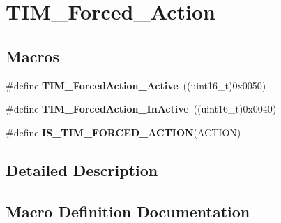 \hypertarget{group___t_i_m___forced___action}{}\section{T\+I\+M\+\_\+\+Forced\+\_\+\+Action}
\label{group___t_i_m___forced___action}
\subsection*{Macros}
\begin{DoxyCompactItemize}
\item 
\hypertarget{group___t_i_m___forced___action_ga19d3769825f1dfdbdbde3edb60310b99}{}\#define {\bfseries T\+I\+M\+\_\+\+Forced\+Action\+\_\+\+Active}~((uint16\+\_\+t)0x0050)\label{group___t_i_m___forced___action_ga19d3769825f1dfdbdbde3edb60310b99}

\item 
\hypertarget{group___t_i_m___forced___action_ga79656f2193ec5e12a15d0ae5b025d273}{}\#define {\bfseries T\+I\+M\+\_\+\+Forced\+Action\+\_\+\+In\+Active}~((uint16\+\_\+t)0x0040)\label{group___t_i_m___forced___action_ga79656f2193ec5e12a15d0ae5b025d273}

\item 
\#define {\bfseries I\+S\+\_\+\+T\+I\+M\+\_\+\+F\+O\+R\+C\+E\+D\+\_\+\+A\+C\+T\+I\+O\+N}(A\+C\+T\+I\+O\+N)
\end{DoxyCompactItemize}


\subsection{Detailed Description}


\subsection{Macro Definition Documentation}
\hypertarget{group___t_i_m___forced___action_gaa2cb16f281d32c95ab974dc5157bfa63}{}
